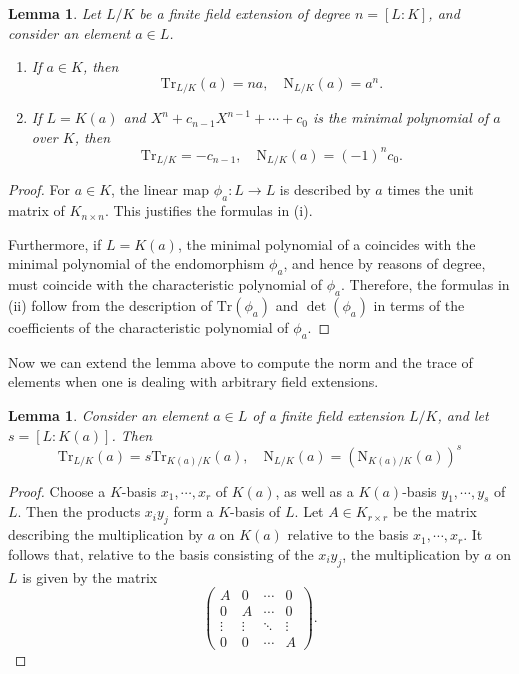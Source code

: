 \documentclass[12pt]{report}
\newtheorem{lemma}[theorem]{Lemma}
\theoremstyle{definition}
\newcommand{\Tr}{\text{Tr}}
\newcommand{\nm}{\text{N}}
\begin{document}
\begin{lemma}
	Let $L/K$ be a finite field extension of degree $n = [L : K]$, and consider an element $a \in L$.
	\begin{enumerate}
		\item If $a \in K$, then
		      $$\Tr_{L/K}(a) = na,\quad \nm_{L/K}(a) = a^n.$$
		\item If $L = K(a)$ and $X^n + c_{n-1}X^{n-1} +\cdots + c_0$ is the minimal polynomial of $a$ over $K$, then
		      $$\Tr_{L/K}=-c_{n-1},\quad \nm_{L/K}(a)=(-1)^nc_0.$$
	\end{enumerate}
\end{lemma}

\begin{proof}
	For $a \in K$, the linear map $\phi_a : L \to L$ is described by $a$ times the unit matrix of $K_{n\times n}$. This justifies the formulas in (i).


	Furthermore, if $L = K(a)$, the minimal polynomial of a coincides with the minimal polynomial of the endomorphism $\phi_a$, and hence by reasons of degree, must coincide with the characteristic polynomial of $\phi_a$. Therefore, the formulas in (ii) follow from the description of $\Tr(\phi_a)$ and $\det(\phi_a)$ in terms of the coefficients of the characteristic polynomial of $\phi_a$.
\end{proof}


Now we can extend the lemma above to compute the norm and the trace of elements when one is dealing with arbitrary field extensions.

\begin{lemma}
	Consider an element $a \in L$ of a finite field extension $L/K$, and let $s = [L : K(a)]$. Then $$\Tr_{L/K}(a)=s\Tr_{K(a)/K}(a),\quad \nm_{L/K}(a)=(\nm_{K(a)/K}(a))^s$$
\end{lemma}

\begin{proof}
	Choose a $K$-basis $x_1, \cdots , x_r$ of $K(a)$, as well as a $K(a)$-basis $y_1, \cdots , y_s$ of $L$. Then the products $x_iy_j$ form a $K$-basis of $L$. Let $A \in K_{r\times r}$ be the matrix describing the multiplication by $a$ on $K(a)$ relative to the basis $x_1, \cdots , x_r$. It follows that, relative to the basis consisting of the $x_iy_j$, the multiplication by $a$ on $L$ is given by the matrix
	$$\begin{pmatrix}
			A      & 0      & \cdots & 0      \\
			0      & A      & \cdots & 0      \\
			\vdots & \vdots & \ddots & \vdots \\
			0      & 0      & \cdots & A
		\end{pmatrix}.$$
\end{proof}
\end{document}
